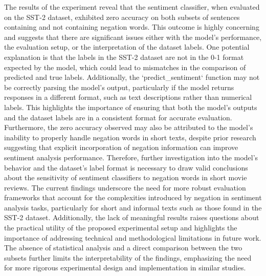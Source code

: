 \documentclass{article}
\begin{document}
The results of the experiment reveal that the sentiment classifier, when evaluated on the SST-2 dataset, exhibited zero accuracy on both subsets of sentences containing and not containing negation words. This outcome is highly concerning and suggests that there are significant issues either with the model's performance, the evaluation setup, or the interpretation of the dataset labels. One potential explanation is that the labels in the SST-2 dataset are not in the 0-1 format expected by the model, which could lead to mismatches in the comparison of predicted and true labels. Additionally, the `predict_sentiment` function may not be correctly parsing the model's output, particularly if the model returns responses in a different format, such as text descriptions rather than numerical labels. This highlights the importance of ensuring that both the model's outputs and the dataset labels are in a consistent format for accurate evaluation. Furthermore, the zero accuracy observed may also be attributed to the model's inability to properly handle negation words in short texts, despite prior research suggesting that explicit incorporation of negation information can improve sentiment analysis performance. Therefore, further investigation into the model's behavior and the dataset's label format is necessary to draw valid conclusions about the sensitivity of sentiment classifiers to negation words in short movie reviews. The current findings underscore the need for more robust evaluation frameworks that account for the complexities introduced by negation in sentiment analysis tasks, particularly for short and informal texts such as those found in the SST-2 dataset. Additionally, the lack of meaningful results raises questions about the practical utility of the proposed experimental setup and highlights the importance of addressing technical and methodological limitations in future work. The absence of statistical analysis and a direct comparison between the two subsets further limits the interpretability of the findings, emphasizing the need for more rigorous experimental design and implementation in similar studies.
\end{document}
